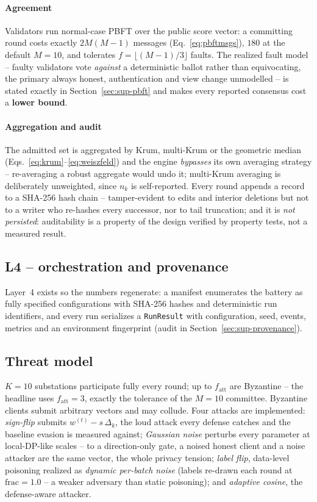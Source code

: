 \paragraph{Agreement}
Validators run normal-case PBFT \cite{castro1999} over the public score
vector: a committing round costs exactly $2M(M-1)$ messages
(Eq.~\ref{eq:pbftmsgs}), $180$ at the default $M{=}10$, and tolerates
$f=\lfloor(M-1)/3\rfloor$ faults. The realized fault model -- faulty
validators vote \emph{against} a deterministic ballot rather than
equivocating, the primary always honest, authentication and view change
unmodelled -- is stated exactly in Section~\ref{sec:sup-pbft} and makes
every reported consensus cost a \textbf{lower bound}.

\paragraph{Aggregation and audit}
The admitted set is aggregated by Krum, multi-Krum or the geometric
median (Eqs.~\ref{eq:krum}--\ref{eq:weiszfeld}) and the engine
\emph{bypasses} its own averaging strategy -- re-averaging a robust
aggregate would undo it; multi-Krum averaging is deliberately
unweighted, since $n_k$ is self-reported. Every round appends a record
to a SHA-256 hash chain -- tamper-evident to edits and interior
deletions but not to a writer who re-hashes every successor, nor to tail
truncation; and it is \emph{not persisted}: auditability is a property
of the design verified by property tests, not a measured result.

\subsection{L4 -- orchestration and provenance}

Layer~4 exists so the numbers regenerate: a manifest enumerates the
battery as fully specified configurations with SHA-256 hashes and
deterministic run identifiers, and every run serializes a
\texttt{RunResult} with configuration, seed, events, metrics and an
environment fingerprint (audit in Section~\ref{sec:sup-provenance}).

\subsection{Threat model}
\label{sec:threat}

$K=10$ substations participate fully every round; up to
$f_{\mathrm{att}}$ are Byzantine -- the headline uses
$f_{\mathrm{att}}=3$, exactly the tolerance of the $M=10$ committee.
Byzantine clients submit arbitrary vectors and may collude. Four attacks
are implemented: \emph{sign-flip} submits $w^{(t)} - s\,\Delta_k$, the
loud attack every defense catches and the baseline evasion is measured
against; \emph{Gaussian noise} perturbs every parameter at
local-DP-like scales -- to a direction-only gate, a noised honest
client and a noise attacker are the same vector, the whole privacy
tension; \emph{label flip}, data-level poisoning realized as
\emph{dynamic per-batch noise} (labels re-drawn each round at
$\mathrm{frac}=1.0$ -- a weaker adversary than static poisoning); and
\emph{adaptive cosine}, the defense-aware attacker.

